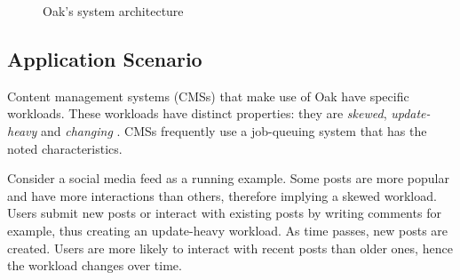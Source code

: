 \documentclass[abstracton,12pt]{scrartcl}
\theoremstyle{definition}
\begin{document}
\begin{figure}[h]
  \begin{center}
  \end{center}
  \caption{Oak's system architecture}
  \label{fig:architecture}
\end{figure}

\subsection{Application Scenario}
\label{sec:application_scenario}

Content management systems (CMSs) that make use of Oak have specific workloads.
These workloads have distinct properties: they are \textit{skewed},
\textit{update-heavy} and \textit{changing} \cite{KW17}. CMSs frequently use a
job-queuing system that has the noted characteristics.

Consider a social media feed as a running example. Some posts are more popular
and have more interactions than others, therefore implying a
skewed workload. Users submit new posts or interact with existing posts by
writing comments for example, thus creating an update-heavy workload. As time
passes, new posts are created. Users are more likely to interact with recent
posts than older ones, hence the workload changes over time.
\end{document}
